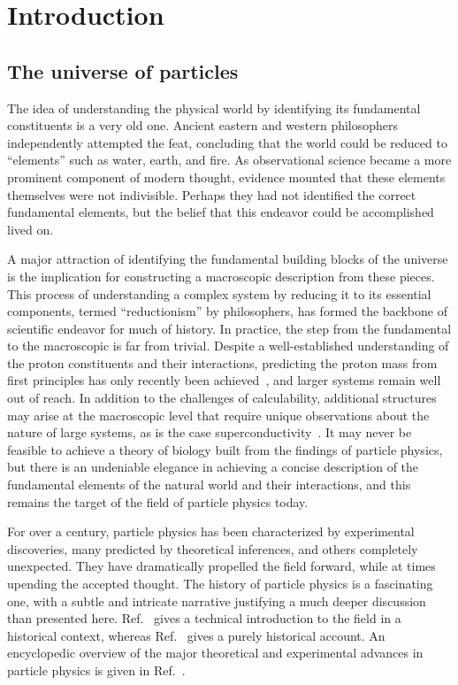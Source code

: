 \chapter{Introduction}
\label{ch:introduction}

\section{The universe of particles}

The idea of understanding the physical world by identifying its
fundamental constituents is a very old one. Ancient eastern and
western philosophers independently attempted the feat, concluding
that the world could be reduced 
to ``elements'' such as water, earth, and fire.
As observational science became a more prominent component of modern thought, 
evidence mounted that these elements themselves were 
not indivisible. Perhaps they had not identified
the correct fundamental elements, but the belief that this endeavor could
be accomplished lived on.

A major attraction of identifying the fundamental building blocks of the universe
is the implication for constructing a macroscopic description from these
pieces. This process of understanding a complex system 
by reducing it to its essential components,
termed ``reductionism'' by philosophers, 
has formed the backbone of scientific endeavor for much of history.
In practice, the step from the fundamental to the macroscopic 
is far from trivial. Despite a well-established
understanding of the proton constituents and their interactions,
predicting the proton mass from first principles has only recently 
been achieved~\cite{Durr:2008zz}, 
and larger systems remain well out of reach.
In addition to the challenges of calculability, additional structures
may arise at the macroscopic level that require unique observations
about the nature of large systems, as is the case
superconductivity~\cite{Anderson393}.
It may never be feasible
to achieve a theory of biology built from the findings of particle 
physics, but there is an undeniable elegance in achieving a concise description
of the fundamental elements of the natural world and their interactions,
and this remains the target of the field of particle physics today. 

For over a century, particle physics has been characterized by experimental
discoveries, many predicted by theoretical inferences, and others 
completely unexpected.
They have dramatically propelled the field forward,
while at times upending the accepted thought.
The history of particle physics is a fascinating one, with a subtle 
and intricate narrative justifying a much deeper discussion than presented
here. Ref.~\cite{Griffiths:2008zz} gives a technical introduction to the field in a historical
context, whereas Ref.~\cite{kragh2002quantum} gives a purely 
historical account. An encyclopedic overview of the major
theoretical and experimental advances in particle physics is given in Ref.~\cite{Ezhela:1996xi}.

